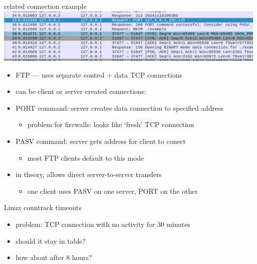 \begin{frame}{related connection example}
\includegraphics[width=\textwidth]{../fire/ftp-port-ex.png}
\begin{itemize}
\item FTP --- uses separate control + data TCP connections
\item can be client or server created connections:
\vspace{.5cm}
\item PORT command: server creates data connection to specified address
    \begin{itemize}
    \item problem for firewalls: looks like `fresh' TCP connection
    \end{itemize}
\item PASV command: server gets address for client to conect
    \begin{itemize}
    \item most FTP clients default to this mode
    \end{itemize}
\item in theory, allows direct server-to-server transfers
    \begin{itemize}
    \item one client uses PASV on one server, PORT on the other
    \end{itemize}
\end{itemize}
\end{frame}

\begin{frame}{Linux conntrack timeouts}
    \begin{itemize}
    \item problem: TCP connection with no activity for 30 minutes
    \item should it stay in table?
    \item how about after 8 hours?
    \end{itemize}
\end{frame}
